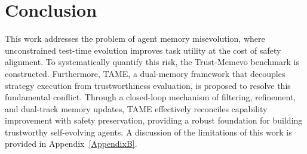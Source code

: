 \documentclass{article}
\theoremstyle{plain}
\theoremstyle{definition}
\theoremstyle{remark}
\begin{document}
\section{Conclusion}
This work addresses the problem of agent memory misevolution, where unconstrained test-time evolution improves task utility at the cost of safety alignment. To systematically quantify this risk, the Trust-Memevo benchmark is constructed. Furthermore, TAME, a dual-memory framework that decouples strategy execution from trustworthiness evaluation, is proposed to resolve this fundamental conflict. Through a closed-loop mechanism of filtering, refinement, and dual-track memory updates, TAME effectively reconciles capability improvement with safety preservation, providing a robust foundation for building trustworthy self-evolving agents. A discussion of the limitations of this work is provided in Appendix~\ref{AppendixB}.






\end{document}
